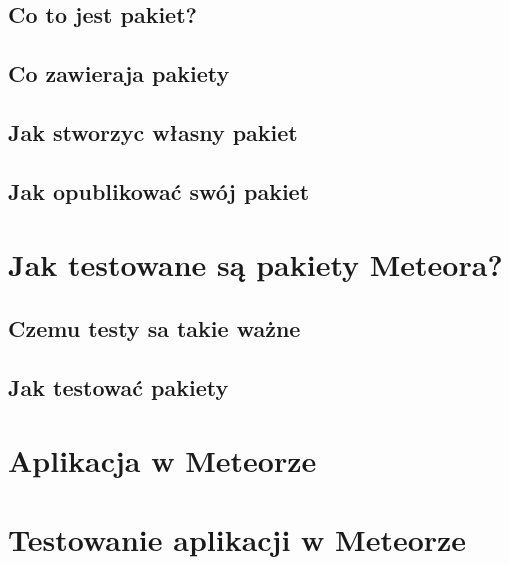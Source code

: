 \documentclass[brudnopis]{xmgr}
\begin{document}
\section{Co to jest pakiet?}

\section{Co zawieraja pakiety}

\section{Jak stworzyc własny pakiet}

\section{Jak opublikować swój pakiet}


      
\chapter{Jak testowane są pakiety Meteora?}

\section{Czemu testy sa takie ważne}
    
\section{Jak testować pakiety}

   

\chapter{Aplikacja w Meteorze}

\chapter{Testowanie aplikacji w Meteorze}
\end{document}
